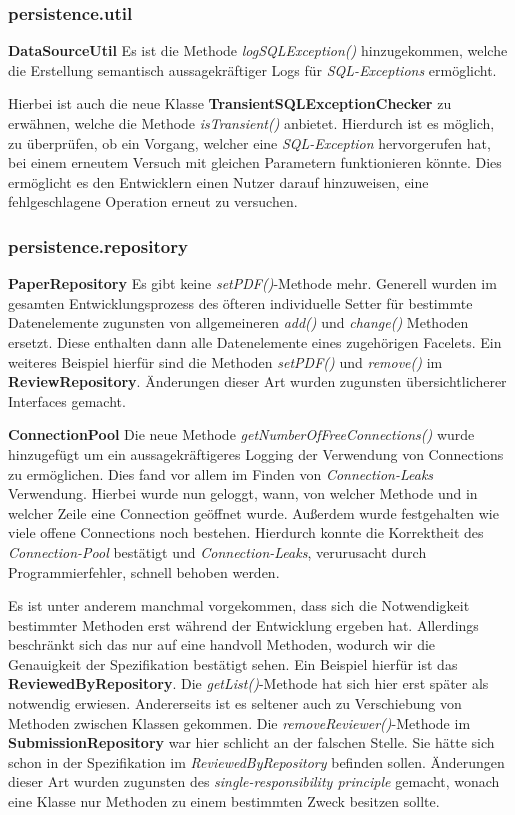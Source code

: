 
\subsubsection{persistence.util}

\textbf{DataSourceUtil} Es ist die Methode \emph{logSQLException()} hinzugekommen, welche die Erstellung
semantisch aussagekräftiger Logs für \emph{SQL-Exceptions} ermöglicht.

Hierbei ist auch die neue Klasse \textbf{TransientSQLExceptionChecker} zu erwähnen, welche
die Methode \emph{isTransient()} anbietet.
Hierdurch ist es möglich, zu überprüfen, ob ein Vorgang,
welcher eine \emph{SQL-Exception} hervorgerufen hat, bei einem erneutem Versuch
mit gleichen Parametern funktionieren könnte.
Dies ermöglicht es den Entwicklern einen Nutzer darauf hinzuweisen,
eine fehlgeschlagene Operation erneut zu versuchen.

\subsubsection{persistence.repository}

\textbf{PaperRepository} Es gibt keine \emph{setPDF()}-Methode mehr.
Generell wurden im gesamten Entwicklungsprozess des öfteren individuelle Setter für
bestimmte Datenelemente zugunsten von allgemeineren \emph{add()} und \emph{change()} Methoden ersetzt.
Diese enthalten dann alle Datenelemente eines zugehörigen Facelets.
Ein weiteres Beispiel hierfür sind die Methoden \emph{setPDF()} und \emph{remove()}
im \textbf{ReviewRepository}.
Änderungen dieser Art wurden zugunsten übersichtlicherer Interfaces gemacht.

\textbf{ConnectionPool} Die neue Methode \emph{getNumberOfFreeConnections()}
wurde hinzugefügt um ein aussagekräftigeres Logging der Verwendung von Connections
zu ermöglichen.
Dies fand vor allem im Finden von \emph{Connection-Leaks} Verwendung.
Hierbei wurde nun geloggt, wann, von welcher Methode und in welcher Zeile eine
Connection geöffnet wurde.
Außerdem wurde festgehalten wie viele offene Connections noch bestehen.
Hierdurch konnte die Korrektheit des \emph{Connection-Pool} bestätigt
und \emph{Connection-Leaks}, verurusacht durch Programmierfehler,
schnell behoben werden.

Es ist unter anderem manchmal vorgekommen, dass sich die Notwendigkeit bestimmter
Methoden erst während der Entwicklung ergeben hat.
Allerdings beschränkt sich das nur auf eine handvoll Methoden, wodurch wir die Genauigkeit der Spezifikation bestätigt
sehen.
Ein Beispiel hierfür ist das \textbf{ReviewedByRepository}.
Die \emph{getList()}-Methode hat sich hier erst später als notwendig erwiesen.
Andererseits ist es seltener auch zu Verschiebung von Methoden zwischen Klassen gekommen.
Die \emph{removeReviewer()}-Methode im \textbf{SubmissionRepository}  war hier schlicht an
der falschen Stelle.
Sie hätte sich schon in der Spezifikation im \emph{ReviewedByRepository} befinden sollen.
Änderungen dieser Art wurden zugunsten des \emph{single-responsibility principle} gemacht,
wonach eine Klasse nur Methoden zu einem bestimmten Zweck besitzen sollte.

